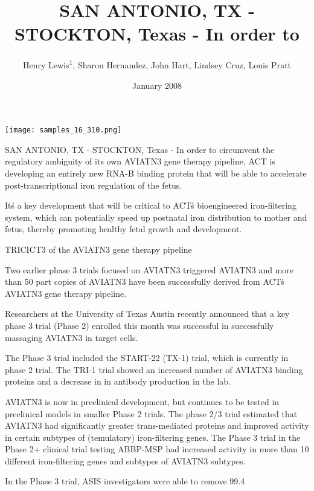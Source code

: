 \documentclass{article}
\title{SAN ANTONIO, TX - STOCKTON, Texas - In order to}
\author{Henry Lewis\textsuperscript{1},  Sharon Hernandez,  John Hart,  Lindsey Cruz,  Louis Pratt}
\affil{\textsuperscript{1}Kyung Hee University}
\date{January 2008}
\begin{document}
\maketitle

\begin{center}
\begin{minipage}{0.75\linewidth}
\texttt{[image: samples\_16\_310.png]}
\end{minipage}
\end{center}

SAN ANTONIO, TX - STOCKTON, Texas - In order to circumvent the regulatory ambiguity of its own AVIATN3 gene therapy pipeline, ACT is developing an entirely new RNA-B binding protein that will be able to accelerate post-transcriptional iron regulation of the fetus.

It\'s a key development that will be critical to ACT\'s bioengineered iron-filtering system, which can potentially speed up postnatal iron distribution to mother and fetus, thereby promoting healthy fetal growth and development.

TRICICT3 of the AVIATN3 gene therapy pipeline

Two earlier phase 3 trials focused on AVIATN3 triggered AVIATN3 and more than 50 part copies of AVIATN3 have been successfully derived from ACT\'s AVIATN3 gene therapy pipeline.

Researchers at the University of Texas Austin recently announced that a key phase 3 trial (Phase 2) enrolled this month was successful in successfully massaging AVIATN3 in target cells.

The Phase 3 trial included the START-22 (TX-1) trial, which is currently in phase 2 trial. The TRI-1 trial showed an increased number of AVIATN3 binding proteins and a decrease in in antibody production in the lab.

AVIATN3 is now in preclinical development, but continues to be tested in preclinical models in smaller Phase 2 trials. The phase 2/3 trial estimated that AVIATN3 had significantly greater trans-mediated proteins and improved activity in certain subtypes of (temulatory) iron-filtering genes. The Phase 3 trial in the Phase 2+ clinical trial testing ABBP-MSP had increased activity in more than 10 different iron-filtering genes and subtypes of AVIATN3 subtypes.

In the Phase 3 trial, ASIS investigators were able to remove 99.4%
\end{document}
